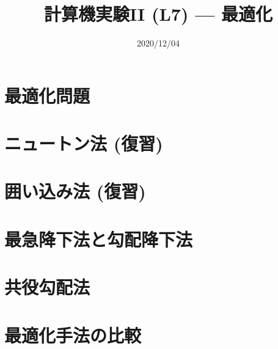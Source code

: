 \documentclass[10pt,dvipdfmx]{beamer}
\title{計算機実験II (L7) --- 最適化}
\date{2020/12/04}
\begin{document}
\begin{frame}
  \titlepage
  \tableofcontents
\end{frame}



\section{最適化問題}




\section{ニュートン法 (復習)}





\section{囲い込み法 (復習)}




\section{最急降下法と勾配降下法}



%
%

\section{共役勾配法}










\section{最適化手法の比較}







\end{document}
